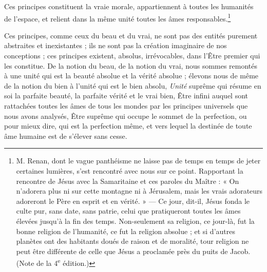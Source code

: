 \documentclass[a4paper, 11pt, oneside, landscape]{article}
\begin{document}
Ces principes constituent la vraie morale, appartiennent à toutes les humanités de l'espace, et relient dans la même unité toutes les âmes responsables.\footnote{M. Renan, dont le vague panthéisme ne laisse pas de temps en temps de jeter certaines lumières, s'est rencontré avec nous sur ce point. Rapportant la rencontre de Jésus avec la Samaritaine et ces paroles du Maître : « On n'adorera plus ni sur cette montagne ni à Jérusalem, mais les vrais adorateurs adoreront le Père en esprit et en vérité. » --- Ce jour, dit-il, Jésus fonda le culte pur, sans date, sans patrie, celui que pratiqueront toutes les âmes élevées jusqu'à la fin des temps. Non-seulement sa religion, ce jour-là, fut la bonne religion de l'humanité, ce fut la religion absolue ; et si d'autres planètes ont des habitants doués de raison et de moralité, tour religion ne peut être différente de celle que Jésus a proclamée près du puits de Jacob. (Note de la 4\textsuperscript{e} édition.)}

Ces principes, comme ceux du beau et du vrai, ne sont pas des entités purement abstraites et inexistantes ; ils ne sont pas la création imaginaire de nos conceptions ; ces principes existent, absolus, irrévocables, dans l'Être premier qui les constitue. De la notion du beau, de la notion du vrai, nous sommes remontés à une unité qui est la beauté absolue et la vérité absolue ; élevons nous de même de la notion du bien à l'unité qui est le bien absolu, \emph{Unité} suprême qui résume en soi la parfaite beauté, la parfaite vérité et le vrai bien, Être infini auquel sont rattachées toutes les âmes de tous les mondes par les principes universels que nous avons analysés, Être suprême qui occupe le sommet de la perfection, ou pour mieux dire, qui est la perfection même, et vers lequel la destinée de toute âme humaine est de s'élever sans cesse.
\end{document}
